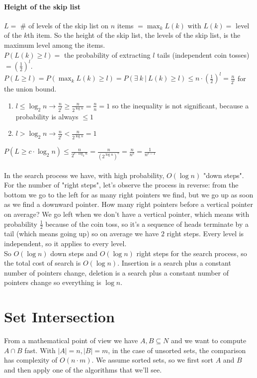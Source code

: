 \documentclass[10pt]{report}
\begin{document}
\paragraph{Height of the skip list} $L =$ \# of levels of the skip list on $n$ items $= \max_k L(k)$ with $L(k) =$ level of the $k$th item. So the height of the skip list, the levels of the skip list, is the maximum level among the items.\\
$P(L(k) \geq l) = $ the probability of extracting $l$ tails (independent coin tosses) $= \left(\frac{1}{2}\right)^l$.\\
$P(L \geq l) = P(\max_k L(k) \geq l) = P(\exists\: k\:|\: L(k) \geq l) \leq n\cdot\left(\frac{1}{2}\right)^l = \frac{n}{2^l}$ for the union bound.
\begin{enumerate}
	\item $l \leq \log_2 n \rightarrow \frac{n}{2^l} \geq \frac{n}{2^{\log n}} = \frac{n}{n} = 1$ so the inequality is not significant, because a probability is always $\leq 1$
	\item $l > \log_2 n \rightarrow \frac{n}{2^l} < \frac{n}{2^{\log n}} = 1$
\end{enumerate}
$P(L \geq c\cdot\log_2 n) \leq \frac{n}{2^{c\cdot\log_2 n}} = \frac{n}{(2^{\log n})^c} = \frac{n}{n^c} = \frac{1}{n^{c-1}}$\\\\
In the search process we have, with high probability, $O(\log n)$ "down steps". For the number of "right steps", let's observe the process in reverse: from the bottom we go to the left for as many right pointers we find, but we go up as soon as we find a downward pointer. How many right pointers before a vertical pointer on average? We go left when we don't have a vertical pointer, which means with probability $\frac{1}{2}$ because of the coin toss, so it's a sequence of heads terminate by a tail (which means going up) so on average we have $2$ right steps. Every level is independent, so it applies to every level.\\
So $O(\log n)$ down steps and $O(\log n)$ right steps for the search process, so the total cost of search is $O(\log n)$. Insertion is a search plus a constant number of pointers change, deletion is a search plus a constant number of pointers change so everything is $\log n$.
\section{Set Intersection}
From a mathematical point of view we have $A,B\subseteq N$ and we want to compute $A \cap B$ fast. With $|A| = n, |B| = m$, in the case of unsorted sets, the comparison has complexity of $O(n\cdot m)$. We assume sorted sets, so we first sort $A$ and $B$ and then apply one of the algorithms that we'll see.
\end{document}
